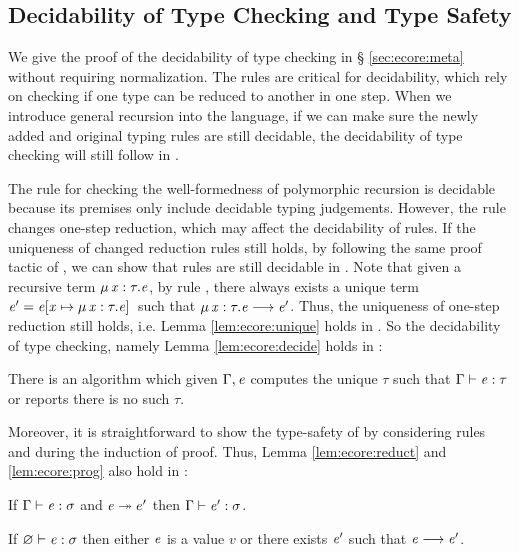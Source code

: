 \subsection{Decidability of Type Checking and Type Safety}
We give the proof of the decidability of type checking \ecore in \S
\ref{sec:ecore:meta} without requiring normalization. The \cast rules
are critical for decidability, which rely on checking if one type can
be reduced to another in one step. When we introduce general recursion
into the language, if we can make sure the newly added and original
typing rules are still decidable, the decidability of type checking
will still follow in \name.

The rule  for checking the well-formedness of
polymorphic recursion is decidable because its premises only include
decidable typing judgements. However, the rule  changes
one-step reduction, which may affect the decidability of \cast
rules. If the uniqueness of changed reduction rules still holds, by
following the same proof tactic of \ecore, we can show that \cast
rules are still decidable in \name. Note that given a recursive term
$\mu \, \mathit{x}  :  \tau  .  \mathit{e}$, by rule , there always exists a unique
term $\mathit{e'}=\mathit{e}  [  \mathit{x}  \mapsto  \mu \, \mathit{x}  :  \tau  .  \mathit{e}  ] \,$ such that $\mu \, \mathit{x}  :  \tau  .  \mathit{e}  \longrightarrow  \mathit{e'}$. Thus, the uniqueness of one-step reduction still holds,
i.e. Lemma \ref{lem:ecore:unique} holds in \name. So the decidability
of type checking, namely Lemma \ref{lem:ecore:decide} holds in \name:

\begin{thm}\label{lem:rec:decide}
	There is an algorithm which given $\Gamma, \mathit{e}$ computes the unique
$\tau$ such that $\Gamma  \vdash  \mathit{e}  :  \tau$ or reports there is no such $\tau$.
\end{thm}

Moreover, it is straightforward to show the type-safety of \name by
considering rules  and  during the
induction of proof. Thus, Lemma \ref{lem:ecore:reduct} and \ref{lem:ecore:prog}
also hold in \name:

\begin{thm}\label{lem:rec:reduct}
If $\Gamma  \vdash  \mathit{e}  :  \sigma$ and $\mathit{e}  \twoheadrightarrow  e'$ then $\Gamma  \vdash  \mathit{e'}  :  \sigma$.
\end{thm}

\begin{thm}[Progress]\label{lem:rec:prog}
If $\varnothing  \vdash  \mathit{e}  :  \sigma$ then either $\mathit{e}$ is a value $v$ or there exists $\mathit{e}'$
such that $\mathit{e}  \longrightarrow  \mathit{e'}$.
\end{thm}
